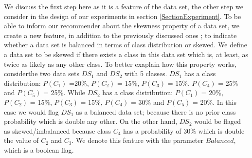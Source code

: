 We discuss the first step here as it is a feature of the data set, the other step we consider in the design of our experiments in section \ref{SectionExperiment}.
To be able to inform our recommender about the skewness property of a data set, we create a new feature, in addition to the previously discussed ones ; to indicate whether a data set is balanced in terms of class distribution or skewed.
We define a data set to be skewed if there exists a class in this data set which is, at least, as twice as likely as any other class.
To better exaplain how this property works, considerthe two data sets $DS_{1}$ and $DS_{2}$ with 5 classes.
$DS_{1}$ has a class distribution: $P(C_{1})$ =20\%, $P(C_{2})$ = 15\%, $P(C_{3})$ = 15\%, $P(C_{4})$ = 25\% and $P(C_{5})$ = 25\%.
While $DS_{2}$ has a class distribution: $P(C_{1})$ = 20\%, $P(C_{2})$ = 15\%, $P(C_{3})$ = 15\%, $P(C_{4})$ = 30\% and $P(C_{5})$ = 20\%.
In this case we would flag $DS_{1}$ as a balanced data set; because there is no prior class probability which is double any other.
On the other hand, $DS_{2}$ would be flaged as skewed/imbalanced because class $C_{4}$ has a probability of 30\% which is double the value
of $C_{2}$ and $C_{3}$. We denote this feature with the parameter $Balanced$, which is a boolean flag.


